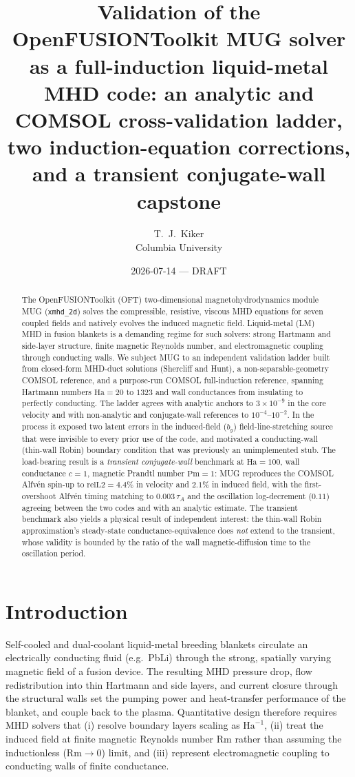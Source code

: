 \documentclass[11pt,letterpaper]{article}
\title{\textbf{Validation of the OpenFUSIONToolkit MUG solver as a
full-induction liquid-metal MHD code: an analytic and COMSOL cross-validation
ladder, two induction-equation corrections, and a transient conjugate-wall
capstone}}
\author{T.~J.~Kiker\\ \small Columbia University}
\date{2026-07-14 --- DRAFT}
\newcommand{\Ha}{\mathrm{Ha}}
\newcommand{\Rm}{\mathrm{Rm}}
\newcommand{\Pm}{\mathrm{Pm}}
\newcommand{\relL}{\mathrm{relL2}}
\newcommand{\by}{b_y}
\newcommand{\tauA}{\tau_A}
\begin{document}
\maketitle

\begin{abstract}
The OpenFUSIONToolkit (OFT) two-dimensional magnetohydrodynamics module MUG
(\texttt{xmhd\_2d}) solves the compressible, resistive, viscous MHD equations for
seven coupled fields and natively evolves the induced magnetic field. Liquid-metal
(LM) MHD in fusion blankets is a demanding regime for such solvers: strong
Hartmann and side-layer structure, finite magnetic Reynolds number, and
electromagnetic coupling through conducting walls. We subject MUG to an
independent validation ladder built from closed-form MHD-duct solutions
(Shercliff and Hunt), a non-separable-geometry COMSOL reference, and a purpose-run
COMSOL full-induction reference, spanning Hartmann numbers $\Ha=20$ to $1323$ and
wall conductances from insulating to perfectly conducting. The ladder agrees with
analytic anchors to $3\times10^{-9}$ in the core velocity and with non-analytic and
conjugate-wall references to $10^{-4}$--$10^{-2}$. In the process it exposed two
latent errors in the induced-field ($\by$) field-line-stretching source that were
invisible to every prior use of the code, and motivated a conducting-wall
(thin-wall Robin) boundary condition that was previously an unimplemented stub.
The load-bearing result is a \emph{transient conjugate-wall} benchmark at
$\Ha=100$, wall conductance $c=1$, magnetic Prandtl number $\Pm=1$: MUG reproduces
the COMSOL Alfv\'en spin-up to $\relL=4.4\%$ in velocity and $2.1\%$ in induced
field, with the first-overshoot Alfv\'en timing matching to $0.003\,\tauA$ and the
oscillation log-decrement ($0.11$) agreeing between the two codes and with an
analytic estimate. The transient benchmark also yields a physical result of
independent interest: the thin-wall Robin approximation's steady-state
conductance-equivalence does \emph{not} extend to the transient, whose validity is
bounded by the ratio of the wall magnetic-diffusion time to the oscillation
period.
\end{abstract}

\section{Introduction}
Self-cooled and dual-coolant liquid-metal breeding blankets circulate an
electrically conducting fluid (e.g.\ PbLi) through the strong, spatially varying
magnetic field of a fusion device. The resulting MHD pressure drop, flow
redistribution into thin Hartmann and side layers, and current closure through the
structural walls set the pumping power and heat-transfer performance of the
blanket, and couple back to the plasma. Quantitative design therefore requires
MHD solvers that (i) resolve boundary layers scaling as $\Ha^{-1}$, (ii) treat the
induced field at finite magnetic Reynolds number $\Rm$ rather than assuming the
inductionless ($\Rm\!\to\!0$) limit, and (iii) represent electromagnetic coupling
to conducting walls of finite conductance.
\end{document}
